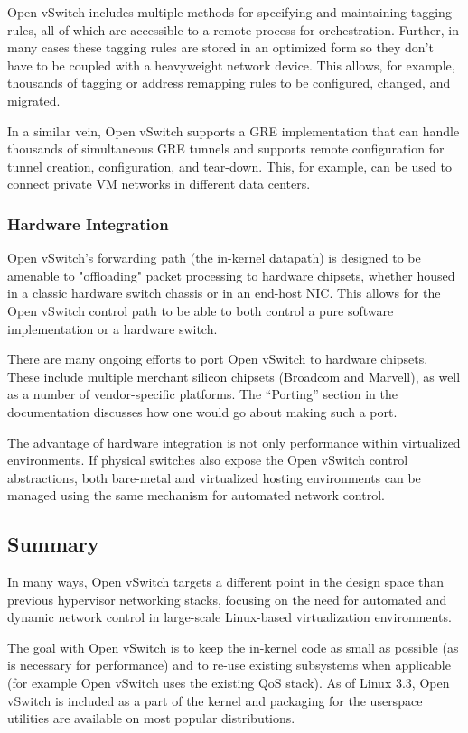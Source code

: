 \documentclass[../sn.tex]{subfiles}
\begin{document}
Open vSwitch includes multiple methods for specifying and maintaining tagging rules, all of which are accessible to a remote process for orchestration.
Further, in many cases these tagging rules are stored in an optimized form so they don't have to be coupled with a heavyweight network device.
This allows, for example, thousands of tagging or address remapping rules to be configured, changed, and migrated.

In a similar vein, Open vSwitch supports a GRE implementation that can handle thousands of simultaneous GRE tunnels and supports remote configuration for tunnel creation, configuration, and tear-down.
This, for example, can be used to connect private VM networks in different data centers.

\subsubsection{Hardware Integration}
Open vSwitch's forwarding path (the in-kernel datapath) is designed to be amenable to "offloading" packet processing to hardware chipsets, whether housed in a classic hardware switch chassis or in an end-host NIC.
This allows for the Open vSwitch control path to be able to both control a pure software implementation or a hardware switch.

There are many ongoing efforts to port Open vSwitch to hardware chipsets.
These include multiple merchant silicon chipsets (Broadcom and Marvell), as well as a number of vendor-specific platforms.
The “Porting” section in the documentation discusses how one would go about making such a port.

The advantage of hardware integration is not only performance within virtualized environments.
If physical switches also expose the Open vSwitch control abstractions, both bare-metal and virtualized hosting environments can be managed using the same mechanism for automated network control.

\subsection{Summary}
In many ways, Open vSwitch targets a different point in the design space than previous hypervisor networking stacks, focusing on the need for automated and dynamic network control in large-scale Linux-based virtualization environments.

The goal with Open vSwitch is to keep the in-kernel code as small as possible (as is necessary for performance) and to re-use existing subsystems when applicable (for example Open vSwitch uses the existing QoS stack).
As of Linux 3.3, Open vSwitch is included as a part of the kernel and packaging for the userspace utilities are available on most popular distributions.

\clearpage
\end{document}
